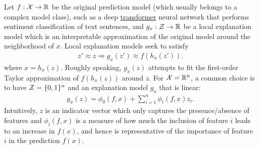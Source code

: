 Let $f: {\mathcal{X}} \rightarrow \mathbb{R}$ be the original prediction model (which usually belongs to a complex model class), such as a deep \href{https://arxiv.org/abs/1706.03762}{transformer} neural network that performs sentiment classification of text sentences, and $g_x: {\mathcal{Z}} \rightarrow \mathbb{R}$ be a local explanation model which is an interpretable approximation of the original model around the neighborhood of $x$. Local explanation models seek to satisfy
\begin{align*}
z' \approx z \Rightarrow g_{x}(z') \approx f(h_{x}(z')).
\end{align*}
where $x = h_{x}(z)$. Roughly speaking, $g_{x}(z)$ attempts to fit the first-order Taylor approximation of $f(h_{x}(z))$ around $z$. For ${\mathcal{X}} = \mathbb{R}^{n}$, a common choice is to have ${\mathcal{Z}} = \{0, 1\}^{n}$ and an explanation model $g_x$ that is linear: 
\begin{align*}
    g_x(z) = \phi_{0}(f, x) + \sum_{i = 1}^{n} \phi_i(f, x) z_i.
\end{align*}
Intuitively, $z$ is an indicator vector which only captures the presence/absence of features and $\phi_{i}(f, x)$ is a measure of how much the inclusion of feature $i$ leads to an increase in $f(x)$, and hence is representative of the importance of feature $i$ in the prediction $f(x)$. 

